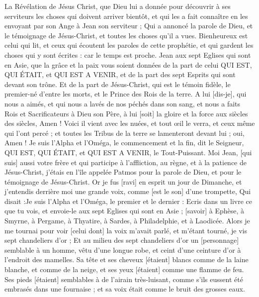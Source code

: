 \BFont
\begin{multicols}{2}
\VerseOne{}La Révélation de Jésus Christ, que Dieu lui a donnée pour découvrir à ses serviteurs les choses qui doivent arriver bientôt, et qui les a fait connaître en les envoyant par son Ange à Jean son serviteur ;
Qui a annoncé la parole de Dieu, et le témoignage de Jésus-Christ, et toutes les choses qu'il a vues.
Bienheureux est celui qui lit, et ceux qui écoutent les paroles de cette prophétie, et qui gardent les choses qui y sont écrites : car le temps est proche.
Jean aux sept Eglises qui sont en Asie, que la grâce et la paix vous soient données de la part de celui QUI EST, QUI ÉTAIT, et QUI EST A VENIR, et de la part des sept Esprits qui sont devant son trône.
Et de la part de Jésus-Christ, qui est le témoin fidèle, le premier-né d'entre les morts, et le Prince des Rois de la terre.
A lui [dis-je], qui nous a aimés, et qui nous a lavés de nos péchés dans son sang, et nous a faits Rois et Sacrificateurs à Dieu son Père, à lui [soit] la gloire et la force aux siècles des siècles, Amen !
Voici il vient avec les nuées, et tout œil le verra, et ceux même qui l'ont percé ; et toutes les Tribus de la terre se lamenteront devant lui ; oui, Amen !
Je suis l'Alpha et l'Oméga, le commencement et la fin, dit le Seigneur, QUI EST, QUI ÉTAIT, et QUI EST A VENIR, le Tout-Puissant.
Moi Jean, [qui suis] aussi votre frère et qui participe à l'affliction, au règne, et à la patience de Jésus-Christ, j'étais en l'île appelée Patmos pour la parole de Dieu, et pour le témoignage de Jésus-Christ.
Or je fus [ravi] en esprit un jour de Dimanche, et j'entendis derrière moi une grande voix, comme [est le son] d'une trompette,
Qui disait :Je suis l'Alpha et l'Oméga, le premier et le dernier : Ecris dans un livre ce que tu vois, et envoie-le aux sept Eglises qui sont en Asie ; [savoir] à Ephèse, à Smyrne, à Pergame, à Thyatire, à Sardes, à Philadelphie, et à Laodicée.
Alors je me tournai pour voir [celui dont] la voix m'avait parlé, et m'étant tourné, je vis sept chandeliers d'or ;
Et au milieu des sept chandeliers d'or un [personnage] semblable à un homme, vêtu d'une longue robe, et ceint d'une ceinture d'or à l'endroit des mamelles.
Sa tête et ses cheveux [étaient] blancs comme de la laine blanche, et comme de la neige, et ses yeux [étaient] comme une flamme de feu.
Ses pieds [étaient] semblables à de l'airain très-luisant, comme s'ils eussent été embrasés dans une fournaise ; et sa voix était comme le bruit des grosses eaux.

\end{multicols}
